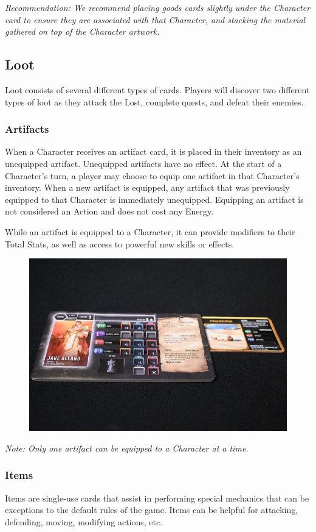 \documentclass[../main.tex]{subfiles}
\begin{document}
\textit{Recommendation: We recommend placing goods cards slightly under the Character card to ensure they are associated with that Character, and stacking the material gathered on top of the Character artwork.}

\subsection{Loot}
Loot consists of several different types of cards. Players will discover two different types of loot as they attack the Lost, complete quests, and defeat their enemies.

\subsubsection{Artifacts}
When a Character receives an artifact card, it is placed in their inventory as an unequipped artifact. Unequipped artifacts have no effect. At the start of a Character’s turn, a player may choose to equip one artifact in that Character’s inventory. When a new artifact is equipped, any artifact that was previously equipped to that Character is immediately unequipped. Equipping an artifact is not considered an Action and does not cost any Energy. 

While an artifact is equipped to a Character, it can provide modifiers to their Total Stats, as well as access to powerful new skills or effects.

\begin{figure}[h]
    \centering
    \includegraphics[width=1\linewidth]{chapters//InventoryandGoods/TimeStrikeArtifacts.jpg}
\end{figure}

\textit{Note: Only one artifact can be equipped to a Character at a time.}

\subsubsection{Items}
Items are single-use cards that assist in performing special mechanics that can be exceptions to the default rules of the game. Items can be helpful for attacking, defending, moving, modifying actions, etc.

\clearpage
\end{document}
